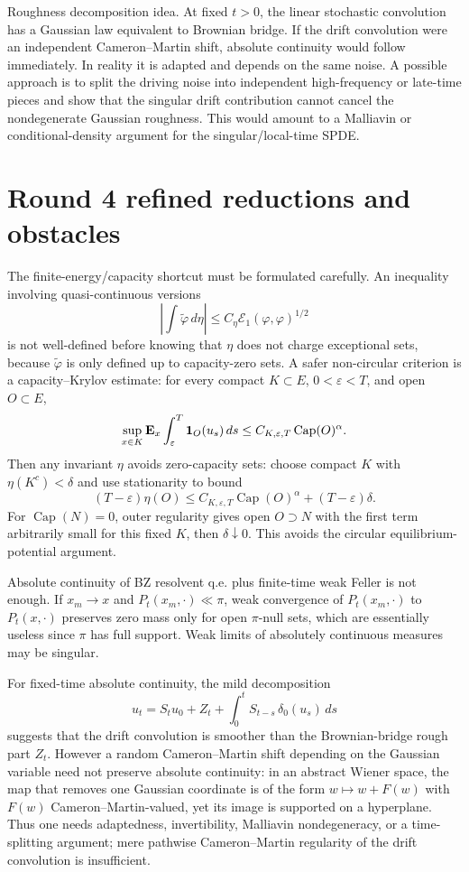 \documentclass[12pt]{article}
\begin{document}
Roughness decomposition idea.  At fixed $t>0$, the linear stochastic
convolution has a Gaussian law equivalent to Brownian bridge.  If the
drift convolution were an independent Cameron--Martin shift, absolute
continuity would follow immediately.  In reality it is adapted and
depends on the same noise.  A possible approach is to split the driving
noise into independent high-frequency or late-time pieces and show that
the singular drift contribution cannot cancel the nondegenerate Gaussian
roughness.  This would amount to a Malliavin or conditional-density
argument for the singular/local-time SPDE.



\section*{Round 4 refined reductions and obstacles}

The finite-energy/capacity shortcut must be formulated carefully.  An
inequality involving quasi-continuous versions
\[
  \left|\int \tilde\varphi\,d\eta\right|
  \le C_\eta \mathcal E_1(\varphi,\varphi)^{1/2}
\]
is not well-defined before knowing that $\eta$ does not charge exceptional
sets, because $\tilde\varphi$ is only defined up to capacity-zero sets.
A safer non-circular criterion is a capacity--Krylov estimate: for every
compact $K\subset E$, $0<\varepsilon<T$, and open $O\subset E$,
\[
 \sup_{x\in K}\mathbf E_x\int_\varepsilon^T{\bf1}_O(u_s)\,ds
 \le C_{K,\varepsilon,T}\operatorname{Cap}(O)^\alpha .
\]
Then any invariant $\eta$ avoids zero-capacity sets: choose compact $K$
with $\eta(K^c)<\delta$ and use stationarity to bound
\[
 (T-\varepsilon)\eta(O)
 \le C_{K,\varepsilon,T}\operatorname{Cap}(O)^\alpha
      +(T-\varepsilon)\delta .
\]
For $\operatorname{Cap}(N)=0$, outer regularity gives open
$O\supset N$ with the first term arbitrarily small for this fixed $K$,
then $\delta\downarrow0$.  This avoids the circular equilibrium-potential
argument.

Absolute continuity of BZ resolvent q.e. plus finite-time weak Feller is
not enough.  If $x_m\to x$ and $P_t(x_m,\cdot)\ll\pi$, weak convergence
of $P_t(x_m,\cdot)$ to $P_t(x,\cdot)$ preserves zero mass only for open
$\pi$-null sets, which are essentially useless since $\pi$ has full
support.  Weak limits of absolutely continuous measures may be singular.

For fixed-time absolute continuity, the mild decomposition
\[
  u_t=S_tu_0+Z_t+\int_0^t S_{t-s}\,\delta_0(u_s)\,ds
\]
suggests that the drift convolution is smoother than the Brownian-bridge
rough part $Z_t$.  However a random Cameron--Martin shift depending on
the Gaussian variable need not preserve absolute continuity: in an
abstract Wiener space, the map that removes one Gaussian coordinate is
of the form $w\mapsto w+F(w)$ with $F(w)$ Cameron--Martin-valued, yet its
image is supported on a hyperplane.  Thus one needs adaptedness,
invertibility, Malliavin nondegeneracy, or a time-splitting argument; mere
pathwise Cameron--Martin regularity of the drift convolution is
insufficient.
\end{document}

